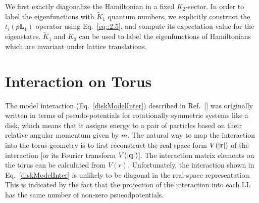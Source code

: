 \documentclass[prb,aps,epsfig,longbibliography,twocolumn]{revtex4-1}
\newcommand{\bsym}[1]{\boldsymbol{#1}}
\begin{document}
We first exactly diagonalize the Hamiltonian in a fixed $K_2$-sector. In order to label the eigenfunctions with $\tilde{K}_1$ quantum numbers, we explicitly construct the ${\tilde{t}}_i (p \bsym{L}_1)$ operator using Eq.~\eqref{eq::2.5}, and compute its expectation value for the eigenstates. $\tilde{K}_1$ and $K_2$  can be  used to label the eigenfunctions of Hamiltonians which are invariant under lattice translations.


\section{Interaction on Torus}
\label{IntOnTorus}
The model interaction (Eq.~\ref{diskModelInter}) described in Ref.~[] was originally written in terms of pseudo-potentials for rotationally symmetric systems like a disk, which means that it assigns energy to a pair of particles based on their relative angular momentum given by $m$. The natural way to map the interaction into the torus geometry is to first reconstruct the real space form $V(|\bf{r}|)$ of the interaction  [or its Fourier transform $V(|\bf{q}|)$]. The interaction matrix elements on the torus can be calculated from $V(r)$. Unfortunately, the interaction shown in Eq.~\eqref{diskModelInter} is unlikely to be diagonal in the real-space representation. This is indicated by the fact that the projection of the interaction into each LL has the same number of non-zero psueodpotentials. 
\end{document}

